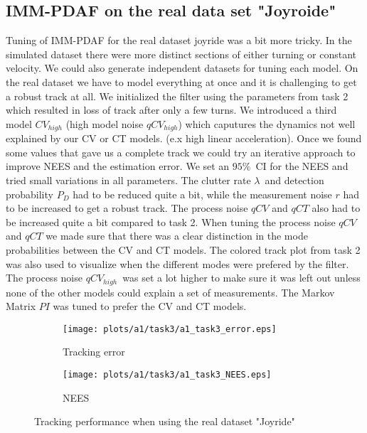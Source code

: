 \subsection{IMM-PDAF on the real data set "Joyroide"}
Tuning of IMM-PDAF for the real dataset joyride was a bit more tricky. In the simulated dataset there were more distinct sections of either turning or constant velocity. We could also generate independent datasets for tuning each model. On the real dataset we have to model everything at once and it is challenging to get a robust track at all. We initialized the filter using the parameters from task 2 which resulted in loss of track after only a few turns. We introduced a third model $CV_{high}$ (high model noise $qCV_{high}$) which caputures the dynamics not well explained by our CV or CT models. (e.x high linear acceleration). Once we found some values that gave us a complete track we could try an iterative approach to improve NEES and the estimation error. We set an $95\%$ CI for the NEES and tried small variations in all parameters. The clutter rate $\lambda$ and detection probability $P_D$ had to be reduced quite a bit, while the measurement noise $r$ had to be increased to get a robust track. The process noise $qCV$ and $qCT$ also had to be increased quite a bit compared to task 2. When tuning the process noise $qCV$ and $qCT$ we made sure that there was a clear distinction in the mode probabilities between the CV and CT models. The colored track plot from task 2 was also used to visualize when the different modes were prefered by the filter. The process noise $qCV_{high}$ was set a lot higher to make sure it was left out unless none of the other models could explain a set of measurements.
The Markov Matrix $PI$ was tuned to prefer the CV and CT models. 
\begin{figure}
    \centering
    \hspace*{-2cm}\begin{adjustbox}{minipage=\linewidth, scale=1}
        \begin{subfigure}{.5\textwidth}
            \texttt{[image: plots/a1/task3/a1\_task3\_error.eps]} 
            \caption{Tracking error}
            \label{fig:task3_tracking_error}
        \end{subfigure}
        \begin{subfigure}{.5\textwidth}
            \texttt{[image: plots/a1/task3/a1\_task3\_NEES.eps]} 
            \caption{NEES}
            \label{fig:task3_NEES}
        \end{subfigure}
    \end{adjustbox}
        \caption{Tracking performance when using the real dataset "Joyride"}
\end{figure}